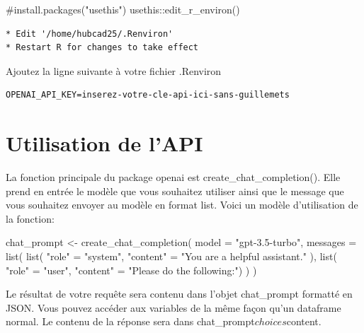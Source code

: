 \documentclass[
  letterpaper,
]{scrbook}
\newenvironment{Shaded}{\begin{snugshade}}{\end{snugshade}}
\newcommand{\AttributeTok}[1]{\textcolor[rgb]{0.40,0.45,0.13}{#1}}
\newcommand{\CommentTok}[1]{\textcolor[rgb]{0.37,0.37,0.37}{#1}}
\newcommand{\FunctionTok}[1]{\textcolor[rgb]{0.28,0.35,0.67}{#1}}
\newcommand{\NormalTok}[1]{\textcolor[rgb]{0.00,0.23,0.31}{#1}}
\newcommand{\OtherTok}[1]{\textcolor[rgb]{0.00,0.23,0.31}{#1}}
\newcommand{\SpecialCharTok}[1]{\textcolor[rgb]{0.37,0.37,0.37}{#1}}
\newcommand{\StringTok}[1]{\textcolor[rgb]{0.13,0.47,0.30}{#1}}
\begin{document}
\begin{Shaded}
\begin{Highlighting}[]
\CommentTok{\#install.packages("usethis")}
\NormalTok{usethis}\SpecialCharTok{::}\FunctionTok{edit\_r\_environ}\NormalTok{()}
\end{Highlighting}
\end{Shaded}

\begin{verbatim}
* Edit '/home/hubcad25/.Renviron'
* Restart R for changes to take effect
\end{verbatim}

Ajoutez la ligne suivante à votre fichier .Renviron

\begin{verbatim}
OPENAI_API_KEY=inserez-votre-cle-api-ici-sans-guillemets
\end{verbatim}

\hypertarget{utilisation-de-lapi}{%
\section{Utilisation de l'API}\label{utilisation-de-lapi}}

La fonction principale du package openai est create\_chat\_completion().
Elle prend en entrée le modèle que vous souhaitez utiliser ainsi que le
message que vous souhaitez envoyer au modèle en format list. Voici un
modèle d'utilisation de la fonction:

\begin{Shaded}
\begin{Highlighting}[]
\NormalTok{chat\_prompt }\OtherTok{\textless{}{-}} \FunctionTok{create\_chat\_completion}\NormalTok{(}
    \AttributeTok{model =} \StringTok{"gpt{-}3.5{-}turbo"}\NormalTok{,}
    \AttributeTok{messages =} \FunctionTok{list}\NormalTok{(}
        \FunctionTok{list}\NormalTok{(}
            \StringTok{"role"} \OtherTok{=} \StringTok{"system"}\NormalTok{,}
            \StringTok{"content"} \OtherTok{=} \StringTok{"You are a helpful assistant."}
\NormalTok{        ),}
        \FunctionTok{list}\NormalTok{(}
            \StringTok{"role"} \OtherTok{=} \StringTok{"user"}\NormalTok{,}
            \StringTok{"content"} \OtherTok{=} \StringTok{"Please do the following:"}\NormalTok{)}
\NormalTok{        )}
\NormalTok{    )}
\end{Highlighting}
\end{Shaded}

Le résultat de votre requête sera contenu dans l'objet chat\_prompt
formatté en JSON. Vous pouvez accéder aux variables de la même façon
qu'un dataframe normal. Le contenu de la réponse sera dans
chat\_prompt\(choices\)content.
\end{document}
